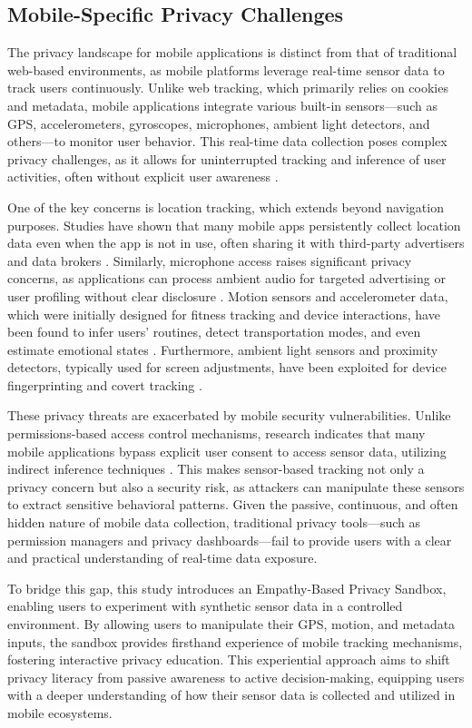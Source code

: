 \documentclass[acmlarge, nonacm]{acmart}
\begin{document}
\subsection{Mobile-Specific Privacy Challenges}
The privacy landscape for mobile applications is distinct from that of traditional web-based environments, as mobile platforms leverage real-time sensor data to track users continuously. Unlike web tracking, which primarily relies on cookies and metadata, mobile applications integrate various built-in sensors—such as GPS, accelerometers, gyroscopes, microphones, ambient light detectors, and others—to monitor user behavior. This real-time data collection poses complex privacy challenges, as it allows for uninterrupted tracking and inference of user activities, often without explicit user awareness \cite{CAHAR}.

One of the key concerns is location tracking, which extends beyond navigation purposes. Studies have shown that many mobile apps persistently collect location data even when the app is not in use, often sharing it with third-party advertisers and data brokers \cite{bian2021supply}. Similarly, microphone access raises significant privacy concerns, as applications can process ambient audio for targeted advertising or user profiling without clear disclosure \cite{pudasaini2024comprehensive}. Motion sensors and accelerometer data, which were initially designed for fitness tracking and device interactions, have been found to infer users’ routines, detect transportation modes, and even estimate emotional states \cite{niemeijer2023promise}. Furthermore, ambient light sensors and proximity detectors, typically used for screen adjustments, have been exploited for device fingerprinting and covert tracking \cite{berdich2023survey}.

These privacy threats are exacerbated by mobile security vulnerabilities. Unlike permissions-based access control mechanisms, research indicates that many mobile applications bypass explicit user consent to access sensor data, utilizing indirect inference techniques \cite{aburas2024user}. This makes sensor-based tracking not only a privacy concern but also a security risk, as attackers can manipulate these sensors to extract sensitive behavioral patterns. Given the passive, continuous, and often hidden nature of mobile data collection, traditional privacy tools—such as permission managers and privacy dashboards—fail to provide users with a clear and practical understanding of real-time data exposure.

To bridge this gap, this study introduces an Empathy-Based Privacy Sandbox, enabling users to experiment with synthetic sensor data in a controlled environment. By allowing users to manipulate their GPS, motion, and metadata inputs, the sandbox provides firsthand experience of mobile tracking mechanisms, fostering interactive privacy education. This experiential approach aims to shift privacy literacy from passive awareness to active decision-making, equipping users with a deeper understanding of how their sensor data is collected and utilized in mobile ecosystems.
\end{document}
